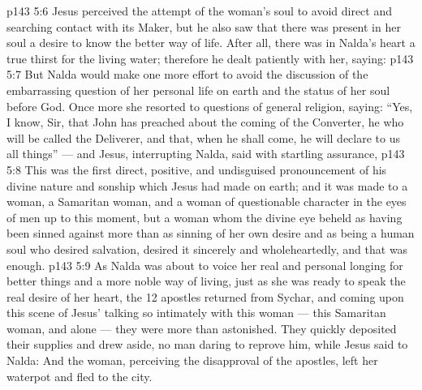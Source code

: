 \vs p143 5:6 Jesus perceived the attempt of the woman’s soul to avoid direct and searching contact with its Maker, but he also saw that there was present in her soul a desire to know the better way of life. After all, there was in Nalda’s heart a true thirst for the living water; therefore he dealt patiently with her, saying: 
\vs p143 5:7 But Nalda would make one more effort to avoid the discussion of the embarrassing question of her personal life on earth and the status of her soul before God. Once more she resorted to questions of general religion, saying: “Yes, I know, Sir, that John has preached about the coming of the Converter, he who will be called the Deliverer, and that, when he shall come, he will declare to us all things” --- and Jesus, interrupting Nalda, said with startling assurance, 
\vs p143 5:8 This was the first direct, positive, and undisguised pronouncement of his divine nature and sonship which Jesus had made on earth; and it was made to a woman, a Samaritan woman, and a woman of questionable character in the eyes of men up to this moment, but a woman whom the divine eye beheld as having been sinned against more than as sinning of her own desire and as  being a human soul who desired salvation, desired it sincerely and wholeheartedly, and that was enough.
\vs p143 5:9 As Nalda was about to voice her real and personal longing for better things and a more noble way of living, just as she was ready to speak the real desire of her heart, the 12 apostles returned from Sychar, and coming upon this scene of Jesus’ talking so intimately with this woman --- this Samaritan woman, and alone --- they were more than astonished. They quickly deposited their supplies and drew aside, no man daring to reprove him, while Jesus said to Nalda:  And the woman, perceiving the disapproval of the apostles, left her waterpot and fled to the city.
